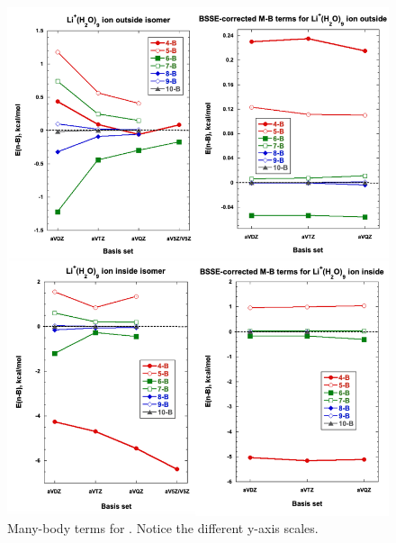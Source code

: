 \begin{figure}[H]
    \centering
    \includegraphics[width=.9\textwidth]{Figures/Chapter_3/figure_6_combined.png}
  \caption{Many-body terms for . Notice the different y-axis scales.}
  \label{fig:MBE_II_7}
\end{figure}